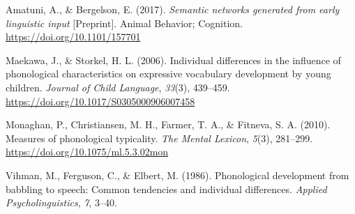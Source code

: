\documentclass[
  man,floatsintext]{apa6}
\newlength{\cslhangindent}
\newlength{\cslentryspacingunit} %
\newenvironment{CSLReferences}[2] %
 {%
  \setlength{\parindent}{0pt}
  \ifodd #1
  \let\oldpar\par
  \def\par{\hangindent=\cslhangindent\oldpar}
  \fi
  \setlength{\parskip}{#2\cslentryspacingunit}
 }%
 {}
\begin{document}
\hypertarget{refs}{}
\begin{CSLReferences}{1}{0}
\leavevmode{}%
Amatuni, A., \& Bergelson, E. (2017). \emph{Semantic networks generated from early linguistic input} {[}Preprint{]}. Animal Behavior; Cognition. \url{https://doi.org/10.1101/157701}

\leavevmode{}%
Maekawa, J., \& Storkel, H. L. (2006). Individual differences in the influence of phonological characteristics on expressive vocabulary development by young children. \emph{Journal of Child Language}, \emph{33}(3), 439--459. \url{https://doi.org/10.1017/S0305000906007458}

\leavevmode{}%
Monaghan, P., Christiansen, M. H., Farmer, T. A., \& Fitneva, S. A. (2010). Measures of phonological typicality. \emph{The Mental Lexicon}, \emph{5}(3), 281--299. \url{https://doi.org/10.1075/ml.5.3.02mon}

\leavevmode{}%
Vihman, M., Ferguson, C., \& Elbert, M. (1986). Phonological development from babbling to speech: Common tendencies and individual differences. \emph{Applied Psycholinguistics}, \emph{7}, 3--40.

\end{CSLReferences}


\clearpage
\renewcommand{\listfigurename}{Figure captions}
\end{document}
